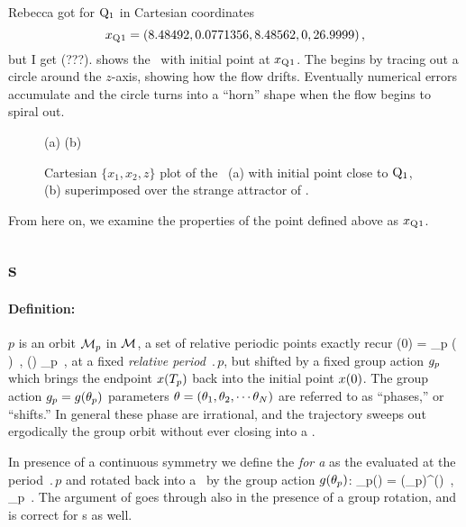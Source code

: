 {Rebecca got for
$\mathrm{Q}_{1}$ in Cartesian coordinates
\[x_{\mathrm{Q}_{}1} = (8.48492,0.0771356,8.48562,0,26.9999)
\,,
\]
but I get (???).
 shows the \cLf\ with initial point at
$x_{\mathrm{Q}_{}1}$. The {\reqv} begins by tracing out a circle
around the $z$-axis, showing how the flow drifts. Eventually
numerical errors accumulate and the circle turns into a
``horn'' shape when the flow begins to spiral out.
\begin{figure}[h]
\begin{center}
(a) %
(b) %
\end{center}
\caption{
Cartesian $\{x_1,x_2,z\}$ plot of the \cLf\ (a) with initial point
close to $\mathrm{Q}_{1}$, (b) superimposed over the strange attractor of
.
    }
\label{fig:CLERelEqui}
\end{figure}

From
here on, we examine the properties of the point defined
above as $x_{\mathrm{Q}_{}1}$.

\subsection{\Rpo s}
\label{SF:rpos}

\paragraph{Definition:
           \Rpo}
$p$ is an orbit ${\cal M}_p$ in {\statesp} ${\cal M}$, a set of relative periodic
points exactly recur
    \toCB
\beq
\ssp (0) = \LieEl_p \ssp ( )
    \,,\qquad
\ssp (\tau) \in \pS_p
    \,,
\label{RPOrelper1}
\eeq
at a fixed {\em relative period} $\period{p}$, but
shifted by a fixed group action ${g_p}$
which brings the endpoint $x ({T_{p}} ) $
back into the initial point $x (0) $.
The group action ${g_p}=g({\bf \theta}_p)$ parameters  \toCB
${\bf \theta} = ({\bf \theta}_1,{\bf \theta}_2,\cdots{\bf \theta}_N)$
are referred to as ``phases,'' or ``shifts.''
%
In general these phase are irrational, and the trajectory  \toCB
sweeps out ergodically the group orbit without ever closing
into a \po.

In presence of a continuous symmetry we define the
\emph{{\FloquetM} for a \rpo} as the {\jacobianM} evaluated
at the period $\period{p}$ and rotated back into a \po\ by the
group action $g({\bf \theta}_p)$:
    \toCB
\beq
 \jMps_p(\ssp) = \LieEl(\gSpace_p)\jMps^(\ssp)
    \,,\qquad
\ssp  \in \pS_p
\,.
The argument of  goes through also in
the presence of a group rotation,
and  is correct for \rpo s as well.

}
